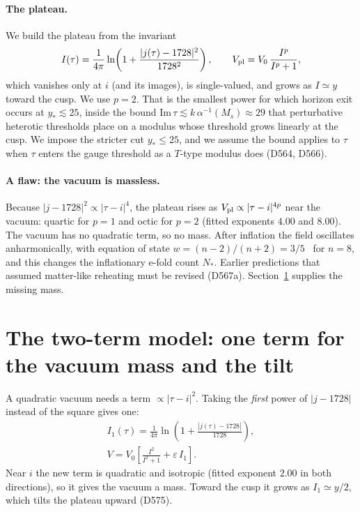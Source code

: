 \documentclass[aps,prd,twocolumn,superscriptaddress,nofootinbib,floatfix]{revtex4-2}
\begin{document}
\paragraph{The plateau.} We build the plateau from the invariant
\begin{equation}
I(\tau) = \frac{1}{4\pi}\ln\!\left(1 + \frac{|j(\tau)-1728|^2}{1728^2}\right), \qquad V_{\rm pl} = V_0\,\frac{I^p}{I^p+1},
\end{equation}
which vanishes only at $i$ (and its images), is single-valued, and grows as $I \simeq y$ toward the cusp. We use $p = 2$. That is the smallest power for which horizon exit occurs at $y_* \lesssim 25$, inside the bound $\mathrm{Im}\,\tau\lesssim k\,\alpha^{-1}(M_s)\approx29$ that perturbative heterotic thresholds place on a modulus whose threshold grows linearly at the cusp. We impose the stricter cut $y_*\le25$, and we assume the bound applies to $\tau$ when $\tau$ enters the gauge threshold as a $T$-type modulus does (D564, D566).

\paragraph{A flaw: the vacuum is massless.} Because $|j - 1728|^2 \propto |\tau - i|^4$, the plateau rises as $V_{\rm pl} \propto |\tau - i|^{4p}$ near the vacuum: quartic for $p=1$ and octic for $p=2$ (fitted exponents $4.00$ and $8.00$). The vacuum has no quadratic term, so no mass. After inflation the field oscillates anharmonically, with equation of state $w = (n-2)/(n+2) = 3/5$~\cite{Turner1983} for $n = 8$, and this changes the inflationary e-fold count $N_*$. Earlier predictions that assumed matter-like reheating must be revised (D567a). Section~\ref{sec:twoterm} supplies the missing mass.

\section{The two-term model: one term for the vacuum mass and the tilt}\label{sec:twoterm}
A quadratic vacuum needs a term $\propto |\tau - i|^2$. Taking the \emph{first} power of $|j-1728|$ instead of the square gives one:
\begin{gather}
I_1(\tau) = \frac{1}{4\pi}\ln\!\left(1 + \frac{|j(\tau)-1728|}{1728}\right), \nonumber\\
V = V_0\left[\frac{I^2}{I^2+1} + \varepsilon\, I_1\right].
\label{eq:twoterm}
\end{gather}
Near $i$ the new term is quadratic and isotropic (fitted exponent $2.00$ in both directions), so it gives the vacuum a mass. Toward the cusp it grows as $I_1 \simeq y/2$, which tilts the plateau upward (D575).
\end{document}
